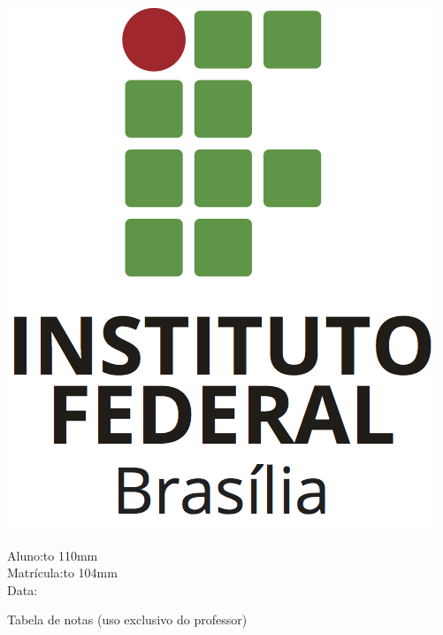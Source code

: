\documentclass[12pt,addpoints,a4paper]{prova-ifb}
\begin{document}
\begin{center}
	\includegraphics[scale=0.3]{IFBVertical.png}
	\cabecalho
\end{center}


\vspace{5mm}

\begin{minipage}[b]{1.0\linewidth}
	Aluno:\enspace\hbox to 110mm{\hrulefill}\\
	Matrícula:\enspace\hbox to 104mm{\hrulefill}\\
	Data: \data
\end{minipage}

\begin{center}
	\fbox{ \duracao}
\end{center}

\begin{center}
	Tabela de notas (uso exclusivo do professor)\\
	\addpoints
	\gradetable[v][questions]
\end{center}
\end{document}
